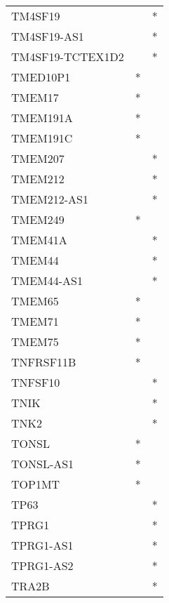 \begin{longtable}{lcc}
TM4SF19          &                &          * \\
TM4SF19-AS1      &                &          * \\
TM4SF19-TCTEX1D2 &                &          * \\
TMED10P1         &              * &            \\
TMEM17           &              * &            \\
TMEM191A         &              * &            \\
TMEM191C         &              * &            \\
TMEM207          &                &          * \\
TMEM212          &                &          * \\
TMEM212-AS1      &                &          * \\
TMEM249          &              * &            \\
TMEM41A          &                &          * \\
TMEM44           &                &          * \\
TMEM44-AS1       &                &          * \\
TMEM65           &              * &            \\
TMEM71           &              * &            \\
TMEM75           &              * &            \\
TNFRSF11B        &              * &            \\
TNFSF10          &                &          * \\
TNIK             &                &          * \\
TNK2             &                &          * \\
TONSL            &              * &            \\
TONSL-AS1        &              * &            \\
TOP1MT           &              * &            \\
TP63             &                &          * \\
TPRG1            &                &          * \\
TPRG1-AS1        &                &          * \\
TPRG1-AS2        &                &          * \\
TRA2B            &                &          * \\

\end{longtable}
